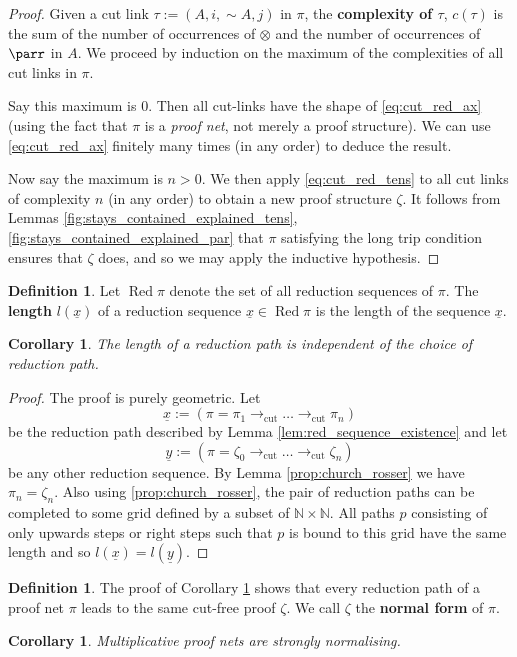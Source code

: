 \documentclass[12pt]{article}
\theoremstyle{plain}
\newtheorem{cor}[thm]{Corollary}
\theoremstyle{definition}
\newtheorem{defn}[thm]{Definition} %
\newcommand{\bb}[1]{\mathbb{#1}}
\newcommand{\lto}{\longrightarrow}
\newcommand{\negation}{\sim}
\begin{document}
	\begin{proof}
		Given a cut link $\tau := (A,i,\negation A, j)$ in $\pi$, the \textbf{complexity of $\tau$}, $c(\tau)$ is the sum of the number of occurrences of $\otimes$ and the number of occurrences of $\parr$ in $A$. We proceed by induction on the maximum of the complexities of all cut links in $\pi$.
		
		Say this maximum is $0$. Then all cut-links have the shape of \eqref{eq:cut_red_ax} (using the fact that $\pi$ is a \emph{proof net}, not merely a proof structure). We can use \eqref{eq:cut_red_ax} finitely many times (in any order) to deduce the result.
		
		Now say the maximum is $n > 0$. We then apply \eqref{eq:cut_red_tens} to all cut links of complexity $n$ (in any order) to obtain a new proof structure $\zeta$. It follows from Lemmas \ref{fig:stays_contained_explained_tens}, \ref{fig:stays_contained_explained_par} that $\pi$ satisfying the long trip condition ensures that $\zeta$ does, and so we may apply the inductive hypothesis.
	\end{proof}
	\begin{defn}
		Let $\operatorname{Red}\pi$ denote the set of all reduction sequences of $\pi$. The \textbf{length} $l(\underline{x})$ of a reduction sequence $\underline{x} \in \operatorname{Red}\pi$ is the length of the sequence $\underline{x}$.
	\end{defn}
	\begin{cor}\label{cor:stable_length}
		The length of a reduction path is independent of the choice of reduction path.
	\end{cor}
	\begin{proof}
		The proof is purely geometric. Let
		\begin{equation}
			\underline{x} := ( \pi = \pi_1 \lto_{\operatorname{cut}} \hdots \lto_{\operatorname{cut}} \pi_n)
		\end{equation}
		be the reduction path described by Lemma \ref{lem:red_sequence_existence} and let
		\begin{equation}
			\underline{y} := (\pi = \zeta_0 \lto_{\operatorname{cut}} \hdots \lto_{\operatorname{cut}} \zeta_n)
		\end{equation}
		be any other reduction sequence. By Lemma \ref{prop:church_rosser} we have $\pi_n = \zeta_n$. Also using \ref{prop:church_rosser}, the pair of reduction paths can be completed to some grid defined by a subset of $\bb{N} \times \bb{N}$. All paths $p$ consisting of only upwards steps or right steps such that $p$ is bound to this grid have the same length and so $l(\underline{x}) = l(\underline{y})$.
	\end{proof}
	\begin{defn}\label{def:normal_form}
		The proof of Corollary \ref{cor:stable_length} shows that every reduction path of a proof net $\pi$ leads to the same cut-free proof $\zeta$. We call $\zeta$ the \textbf{normal form} of $\pi$.
	\end{defn}
	\begin{cor}
		Multiplicative proof nets are strongly normalising.
	\end{cor}
\end{document}
